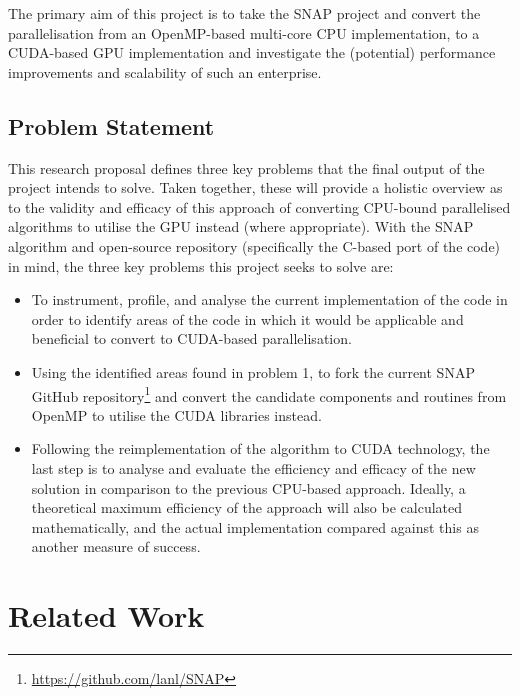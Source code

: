 \documentclass[conference]{IEEEtran}
\begin{document}
The primary aim of this project is to take the SNAP project and convert the parallelisation from an OpenMP-based multi-core CPU implementation, to a CUDA-based GPU implementation and investigate the (potential) performance improvements and scalability of such an enterprise.

\subsection{Problem Statement}

This research proposal defines three key problems that the final output of the project intends to solve. Taken together, these will provide a holistic overview as to the validity and efficacy of this approach of converting CPU-bound parallelised algorithms to utilise the GPU instead (where appropriate). With the SNAP algorithm and open-source repository (specifically the C-based port of the code) in mind, the three key problems this project seeks to solve are:

\begin{itemize}

\item To instrument, profile, and analyse the current implementation of the code in order to identify areas of the code in which it would be applicable and beneficial to convert to CUDA-based parallelisation.

\item Using the identified areas found in problem 1, to fork the current SNAP GitHub repository\footnote{\url{https://github.com/lanl/SNAP}} and convert the candidate components and routines from OpenMP to utilise the CUDA libraries instead.

\item Following the reimplementation of the algorithm to CUDA technology, the last step is to analyse and evaluate the efficiency and efficacy of the new solution in comparison to the previous CPU-based approach. Ideally, a theoretical maximum efficiency of the approach will also be calculated mathematically, and the actual implementation compared against this as another measure of success.

\end{itemize}


\section{Related Work}
\end{document}
